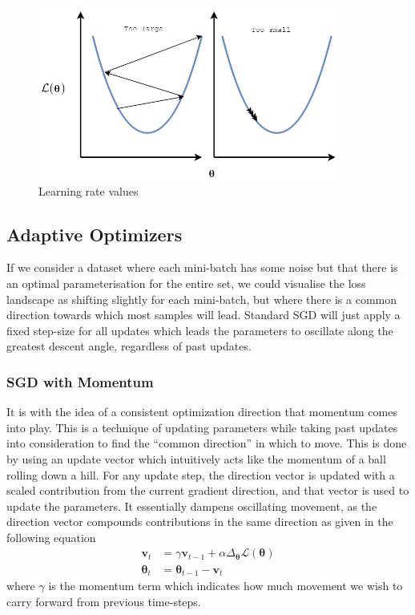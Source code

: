 \documentclass{report}
\begin{document}
\begin{figure}[h]
 \centering
 \includegraphics[width=10cm]{learningrate}
 \caption{Learning rate values}
 \label{fig:learning-rate:1}
\end{figure}

\subsection{Adaptive Optimizers} \label{optimizers:1}
If we consider a dataset where each mini-batch has some noise but that there is an optimal parameterisation for the entire set, we could visualise the loss landscape as shifting slightly for each mini-batch, but where there is a common direction towards which most samples will lead. Standard SGD will just apply a fixed step-size for all updates which leads the parameters to oscillate along the greatest descent angle, regardless of past updates. \par

\subsubsection{SGD with Momentum}
It is with the idea of a consistent optimization direction that momentum \parencite{backprop} comes into play. This is a technique of updating parameters while taking past updates into consideration to find the ``common direction'' in which to move. This is done by using an update vector which intuitively acts like the momentum of a ball rolling down a hill. For any update step, the direction vector is updated with a scaled contribution from the current gradient direction, and that vector is used to update the parameters. It essentially dampens oscillating movement, as the direction vector compounds contributions in the same direction as given in the following equation
\begin{align}
 \bm{v}_t      & = \gamma \bm{v}_{t-1} + \alpha \Delta_{\bm{\theta}} \mathcal{L}(\bm{\theta}) \\
 \bm{\theta}_t & = \bm{\theta}_{t-1} - \bm{v}_t
\end{align}
where $\gamma$ is the momentum term which indicates how much movement we wish to carry forward from previous time-steps.
\end{document}

